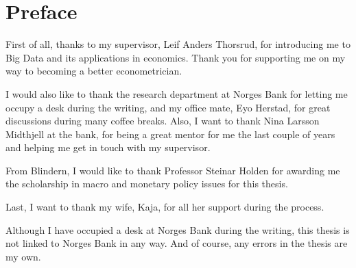 \section*{Preface}

First of all, thanks to my supervisor, Leif Anders Thorsrud, for introducing me to Big Data and its applications in economics. Thank you for supporting me on my way to becoming a better econometrician.

I would also like to thank the research department at Norges Bank for letting me occupy a desk during the writing, and my office mate, Eyo Herstad, for great discussions during many coffee breaks. Also, I want to thank Nina Larsson Midthjell at the bank, for being a great mentor for me the last couple of years and helping me get in touch with my supervisor.

From Blindern, I would like to thank Professor Steinar Holden for awarding me the scholarship in macro and monetary policy issues for this thesis.

Last, I want to thank my wife, Kaja, for all her support during the process.

Although I have occupied a desk at Norges Bank during the writing, this thesis is not linked to Norges Bank in any way. And of course, any errors in the thesis are my own.